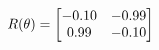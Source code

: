 \documentclass[preview]{standalone}
\begin{document}
\begin{align*}
\special{dvisvgm:raw <g id='unique000'>}R(\theta) = \begin{bmatrix}-0.10 & -0.99\\0.99 & -0.10\end{bmatrix}\special{dvisvgm:raw </g>}
\end{align*}
\end{document}
